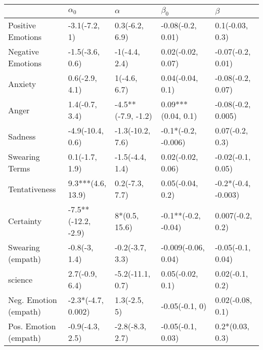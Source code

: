 \begin{tabular}{lllll}
\toprule
{} &           $\alpha_0$ &            $\alpha$ &            $\beta_0$ &              $\beta$ \\
\midrule
Positive Emotions     &        -3.1(-7.2, 1) &      0.3(-6.2, 6.9) &    -0.08(-0.2, 0.01) &      0.1(-0.03, 0.3) \\
Negative Emotions     &      -1.5(-3.6, 0.6) &       -1(-4.4, 2.4) &    0.02(-0.02, 0.07) &    -0.07(-0.2, 0.01) \\
Anxiety               &       0.6(-2.9, 4.1) &        1(-4.6, 6.7) &     0.04(-0.04, 0.1) &    -0.08(-0.2, 0.07) \\
Anger                 &       1.4(-0.7, 3.4) &  -4.5**(-7.9, -1.2) &   0.09***(0.04, 0.1) &   -0.08(-0.2, 0.005) \\
Sadness               &     -4.9(-10.4, 0.6) &    -1.3(-10.2, 7.6) &  -0.1*(-0.2, -0.006) &      0.07(-0.2, 0.3) \\
Swearing Terms        &       0.1(-1.7, 1.9) &     -1.5(-4.4, 1.4) &    0.02(-0.02, 0.06) &    -0.02(-0.1, 0.05) \\
Tentativeness         &    9.3***(4.6, 13.9) &      0.2(-7.3, 7.7) &     0.05(-0.04, 0.2) &  -0.2*(-0.4, -0.003) \\
Certainty             &  -7.5**(-12.2, -2.9) &       8*(0.5, 15.6) &  -0.1**(-0.2, -0.04) &     0.007(-0.2, 0.2) \\
Swearing (empath)     &        -0.8(-3, 1.4) &     -0.2(-3.7, 3.3) &  -0.009(-0.06, 0.04) &    -0.05(-0.1, 0.04) \\
science               &       2.7(-0.9, 6.4) &    -5.2(-11.1, 0.7) &     0.05(-0.02, 0.1) &      0.02(-0.1, 0.2) \\
Neg. Emotion (empath) &   -2.3*(-4.7, 0.002) &        1.3(-2.5, 5) &       -0.05(-0.1, 0) &     0.02(-0.08, 0.1) \\
Pos. Emotion (empath) &      -0.9(-4.3, 2.5) &     -2.8(-8.3, 2.7) &    -0.05(-0.1, 0.03) &      0.2*(0.03, 0.3) \\
\bottomrule
\end{tabular}

